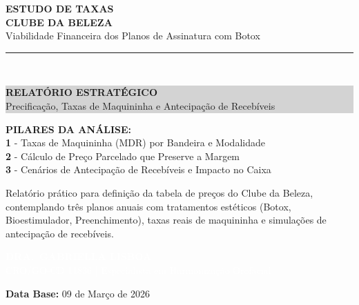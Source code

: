 \documentclass[12pt, a4paper]{article}
\begin{document}
\begin{titlepage}
    \centering
    \vspace*{3cm}
    {\Huge \textbf{\textcolor{primaryColor}{ESTUDO DE TAXAS}}} \\
    \vspace{0.5cm}
    {\Large \textbf{CLUBE DA BELEZA}} \\
    \vspace{0.3cm}
    {\large Viabilidade Financeira dos Planos de Assinatura com Botox} \\
    \vspace{2cm}
    \rule{10cm}{1.5pt} \\
    \vspace{0.5cm}
    \colorbox{lightGray}{%
        \parbox{0.9\textwidth}{%
            \centering
            \vspace{0.3cm}
            {\Large \textbf{RELATÓRIO ESTRATÉGICO}} \\
            \vspace{0.3cm}
            {\large Precificação, Taxas de Maquininha e Antecipação de Recebíveis} \\
            \vspace{0.3cm}
        }%
    }
    \vspace{2cm}

    \begin{flushleft}
    \textbf{PILARES DA ANÁLISE:} \\
    \vspace{0.2cm}
    \textcolor{primaryColor}{\textbf{1}} - Taxas de Maquininha (MDR) por Bandeira e Modalidade \\
    \textcolor{primaryColor}{\textbf{2}} - Cálculo de Preço Parcelado que Preserve a Margem \\
    \textcolor{primaryColor}{\textbf{3}} - Cenários de Antecipação de Recebíveis e Impacto no Caixa
    \end{flushleft}

    \vfill
    {\small Relatório prático para definição da tabela de preços do Clube da Beleza, contemplando três planos anuais com tratamentos estéticos (Botox, Bioestimulador, Preenchimento), taxas reais de maquininha e simulações de antecipação de recebíveis.} \\
    \vspace{1.5cm}

    \colorbox{accentColor}{%
        \parbox{0.9\textwidth}{%
            \centering
            \vspace{0.6cm}
            \textcolor{white}{\Large \textbf{DRA.\ GABRIELLA LISBOA}} \\
            \vspace{0.2cm}
            \textcolor{white}{\normalsize CRO/GO-CD 11836 | Especialista em Harmonização Orofacial} \\
            \vspace{0.6cm}
        }%
    }

    \vspace{0.2cm}
    \textbf{Data Base:} 09 de Março de 2026
\end{titlepage}
\end{document}

